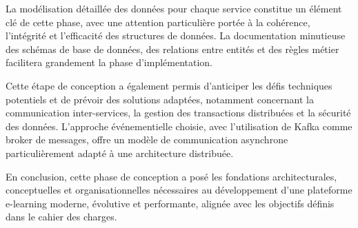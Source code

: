 La modélisation détaillée des données pour chaque service constitue un élément clé de cette phase, avec une attention particulière portée à la cohérence, l'intégrité et l'efficacité des structures de données. La documentation minutieuse des schémas de base de données, des relations entre entités et des règles métier facilitera grandement la phase d'implémentation.

Cette étape de conception a également permis d'anticiper les défis techniques potentiels et de prévoir des solutions adaptées, notamment concernant la communication inter-services, la gestion des transactions distribuées et la sécurité des données. L'approche événementielle choisie, avec l'utilisation de Kafka comme broker de messages, offre un modèle de communication asynchrone particulièrement adapté à une architecture distribuée.

En conclusion, cette phase de conception a posé les fondations architecturales, conceptuelles et organisationnelles nécessaires au développement d'une plateforme e-learning moderne, évolutive et performante, alignée avec les objectifs définis dans le cahier des charges. 